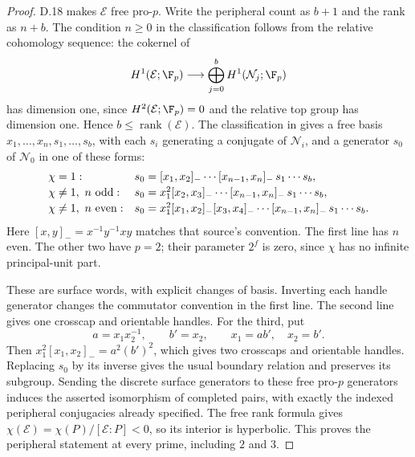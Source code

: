 \begin{proof}
D.18 makes $\mathcal E$ free pro-$p$. Write the peripheral count as $b+1$ and the rank as $n+b$. The condition $n\geq0$ in the classification follows from the relative cohomology sequence: the cokernel of
\[
 H^1(\mathcal E;\F_p)\longrightarrow
       \bigoplus_{j=0}^{b}H^1(\mathcal N_j;\F_p)
\]
has dimension one, since $H^2(\mathcal E;\F_p)=0$ and the relative top group has dimension one. Hence $b\leq\operatorname{rank}(\mathcal E)$.
The classification in \cite[Theorem 3.3]{R-Wilkes} gives a free basis
$x_1,\ldots,x_n,s_1,\ldots,s_b$, with each $s_i$ generating a conjugate of $\mathcal N_i$, and a generator $s_0$ of $\mathcal N_0$ in one of these forms:
\[
\begin{array}{ll}
 \chi=1:&
 s_0=[x_1,x_2]_{-}\cdots[x_{n-1},x_n]_{-}\,s_1\cdots s_b,
 \\[2pt]
 \chi\ne1,\ n\ {\rm odd}:&
 s_0=x_1^2[x_2,x_3]_{-}\cdots[x_{n-1},x_n]_{-}\,s_1\cdots s_b,
 \\[2pt]
 \chi\ne1,\ n\ {\rm even}:&
 s_0=x_1^2[x_1,x_2]_{-}[x_3,x_4]_{-}\cdots
 [x_{n-1},x_n]_{-}\,s_1\cdots s_b .
\end{array}
\]
Here $[x,y]_{-}=x^{-1}y^{-1}xy$ matches that source's convention. The first line has $n$ even. The other two have $p=2$; their parameter $2^f$ is zero, since $\chi$ has no infinite principal-unit part.

These are surface words, with explicit changes of basis. Inverting each handle generator changes the commutator convention in the first line. The second line gives one crosscap and orientable handles. For the third, put
\[
 a=x_1x_2^{-1},\qquad b'=x_2,\qquad
 x_1=ab',\quad x_2=b'.
\]
Then $x_1^2[x_1,x_2]_{-}=a^2(b')^2$, which gives two crosscaps and orientable handles. Replacing $s_0$ by its inverse gives the usual boundary relation and preserves its subgroup. Sending the discrete surface generators to these free pro-$p$ generators induces the asserted isomorphism of completed pairs, with exactly the indexed peripheral conjugacies already specified. The free rank formula gives
$\chi(\mathcal E)=\chi(P)/[\mathcal E:P]<0$, so its interior is hyperbolic. This proves the peripheral statement at every prime, including $2$ and $3$.
\end{proof}


